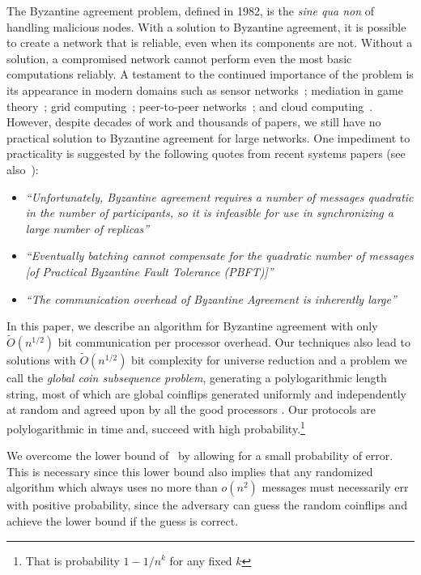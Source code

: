 \documentclass{sig-alternate}
\begin{document}
The Byzantine agreement problem, defined in 1982, is the \emph{sine qua non} of handling malicious nodes.   With a solution to Byzantine agreement, it is possible to create a network that is reliable, even when its components are not.  Without a solution, a compromised network cannot perform even the most basic computations reliably.  A testament to the continued importance of the problem is its appearance in modern domains such as sensor networks~\cite{shi2004designing}; mediation in game theory~\cite{ADGH,ADH}; grid computing~\cite{anderson2002worldwide}; peer-to-peer networks~\cite{rhea2003pond}; and cloud computing~\cite{wright2009contemporary}.  However, despite decades of work and thousands of papers, we still have no practical solution to Byzantine agreement for large networks.  One impediment to practicality is suggested by the following quotes from recent systems papers (see also~\cite{castro2002practical,Malkhi97unreliableintrusion,amir2006scaling,agbaria2003overcoming,1098025}):

\begin{itemize}
\item \emph{``Unfortunately, Byzantine agreement requires a number of messages quadratic in the number of participants, so it is infeasible for use in synchronizing a large number of replicas''}~\cite{rhea2003pond}

\item \emph{``Eventually batching cannot compensate for the quadratic number of messages [of Practical Byzantine Fault Tolerance (PBFT)]''}~\cite{CMLRS}

\item \emph{``The communication overhead of Byzantine Agreement is inherently large''}~\cite{Cheng2009219}

\end{itemize}

In this paper, we describe an algorithm for Byzantine agreement with only $\tilde{O}(n^{1/2})$ bit communication per processor overhead.  
Our  techniques also lead to solutions with $\tilde{O}(n^{1/2})$ bit complexity for universe reduction and a problem we call  the {\it  global coin subsequence problem},  generating a polylogarithmic length string, most of which are global coinflips generated uniformly and independently at random and agreed upon by all the good processors .  Our protocols are polylogarithmic in time and, succeed with high probability.\footnote{That is probability $1-1/n^{k}$ for any fixed $k$}

We overcome the lower bound of~\cite{DR} by allowing for a small probability of error.  This is necessary since this lower bound also implies that any randomized algorithm which always uses no more than $o(n^{2})$ messages must necessarily err with positive probability, since the adversary can guess the random coinflips
and achieve the lower bound if the guess is correct.
\end{document}
